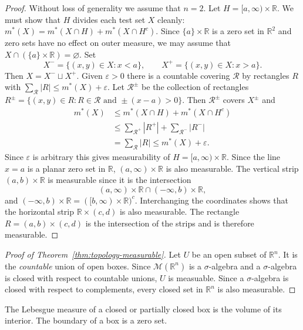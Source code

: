 \documentclass[11pt]{article}
\begin{document}
\begin{proof}
  Without loss of generality we assume that $n=2$.  Let $H = [a, \infty) \times \mathbb{R}$.  We must show that $H$ divides each test set $X$ cleanly: $m^*(X) = m^*(X \cap H) + m^*(X \cap H^c)$.  Since $\{ a \} \times \mathbb{R}$ is a zero set in $\mathbb{R}^2$ and zero sets have no effect on outer measure, we may assume that $X \cap (\{ a \} \times \mathbb{R}) = \varnothing$.  Set
  \[
    X^- = \{ (x,y) \in X \colon x < a \}, \qquad
    X^+ = \{ (x,y) \in X \colon x > a \}.
  \]
  Then $X = X^- \sqcup X^+$.  Given $\varepsilon > 0$ there is a countable covering $\mathcal{R}$ by rectangles $R$ with $\sum_{\mathcal{R}} |R| \leqslant m^*(X) + \varepsilon$.  Let $\mathcal{R}^{\pm}$ be the collection of rectangles $R^\pm = \{ (x,y) \in R \colon R \in \mathcal{R} \text{ and } \pm (x-a) > 0 \}$.  Then $\mathcal{R}^\pm$ covers $X^\pm$ and
  \begin{align*}
    m^*(X) &\leqslant m^*(X \cap H) + m^*(X \cap H^c) \\
    &\leqslant \sum_{\mathcal{R}^+} |R^+| + \sum_{\mathcal{R}^-} |R^-| \\
    &= \sum_{\mathcal{R}} |R| \leqslant m^*(X) + \varepsilon.
  \end{align*}
  Since $\varepsilon$ is arbitrary this gives measurability of $H = [a,\infty) \times \mathbb{R}$.  Since the line $x=a$ is a planar zero set in $\mathbb{R}$, $(a,\infty) \times \mathbb{R}$ is also measurable.  The vertical strip $(a,b) \times \mathbb{R}$ is measurable since it is the intersection
  \[
    (a,\infty) \times \mathbb{R} \cap (-\infty, b) \times \mathbb{R},
  \]
  and $(-\infty, b) \times \mathbb{R} = ( [b,\infty) \times \mathbb{R} )^c$.  Interchanging the coordinates shows that the horizontal strip $\mathbb{R} \times (c,d)$ is also measurable.  The rectangle $R = (a,b) \times (c,d)$ is the intersection of the strips and is therefore measurable.
\end{proof}

\begin{proof}[Proof of Theorem~\ref{thm:topology-measurable}]
  Let $U$ be an open subset of $\mathbb{R}^n$.  It is the \textit{countable} union of open boxes.  Since $\mathcal{M}(\mathbb{R}^n)$ is a $\sigma$-algebra and a $\sigma$-algebra is closed with respect to countable unions, $U$ is measuable.  Since a $\sigma$-algebra is closed with respect to complements, every closed set in $\mathbb{R}^n$ is also measurable.
\end{proof}

\begin{cor}
  The Lebesgue measure of a closed or partially closed box is the volume of its interior.  The boundary of a box is a zero set.
\end{cor}
\end{document}
